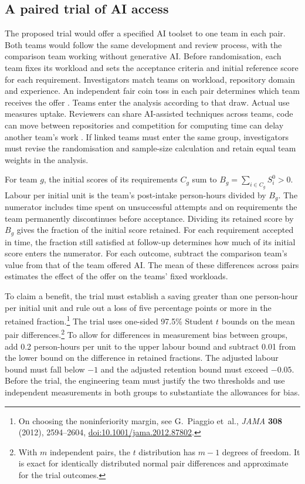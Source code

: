 \subsection{A paired trial of AI access}
\label{sec:causal-experiment}

The proposed trial would offer a specified AI toolset to one team in each pair. Both teams would follow the same development and review process, with the comparison team working without generative AI. Before randomisation, each team fixes its workload and sets the acceptance criteria and initial reference score for each requirement. Investigators match teams on workload, repository domain and experience. An independent fair coin toss in each pair determines which team receives the offer \cite{imai2009}. Teams enter the analysis according to that draw. Actual use measures uptake. Reviewers can share AI-assisted techniques across teams, code can move between repositories and competition for computing time can delay another team's work \cite{hudgens2008}. If linked teams must enter the same group, investigators must revise the randomisation and sample-size calculation and retain equal team weights in the analysis.

For team $g$, the initial scores of its requirements $C_g$ sum to $B_g=\sum_{i\in C_g}S_i^0>0$. Labour per initial unit is the team's post-intake person-hours divided by $B_g$. The numerator includes time spent on unsuccessful attempts and on requirements the team permanently discontinues before acceptance. Dividing its retained score by $B_g$ gives the fraction of the initial score retained. For each requirement accepted in time, the fraction still satisfied at follow-up determines how much of its initial score enters the numerator. For each outcome, subtract the comparison team's value from that of the team offered AI. The mean of these differences across pairs estimates the effect of the offer on the teams' fixed workloads.

To claim a benefit, the trial must establish a saving greater than one person-hour per initial unit and rule out a loss of five percentage points or more in the retained fraction.\footnote{On choosing the noninferiority margin, see G.~Piaggio et~al., \emph{JAMA} \textbf{308} (2012), 2594--2604, \href{https://doi.org/10.1001/jama.2012.87802}{doi:10.1001/jama.2012.87802}.} The trial uses one-sided 97.5\% Student $t$ bounds on the mean pair differences.\footnote{With $m$ independent pairs, the $t$ distribution has $m-1$ degrees of freedom. It is exact for identically distributed normal pair differences and approximate for the trial outcomes.} To allow for differences in measurement bias between groups, add 0.2 person-hours per unit to the upper labour bound and subtract 0.01 from the lower bound on the difference in retained fractions. The adjusted labour bound must fall below $-1$ and the adjusted retention bound must exceed $-0.05$. Before the trial, the engineering team must justify the two thresholds and use independent measurements in both groups to substantiate the allowances for bias.

